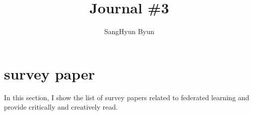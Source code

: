 \documentclass[manuscript,screen,review]{acmart}
\begin{document}
\title{Journal \#3}

\author{SangHyun Byun}


\renewcommand{\shortauthors}{SangHyun, et al.}

\begin{abstract}
  
\end{abstract}


\maketitle

\section{survey paper}
In this section, I show the list of survey papers related to federated learning and provide critically and creatively read.
\end{document}
